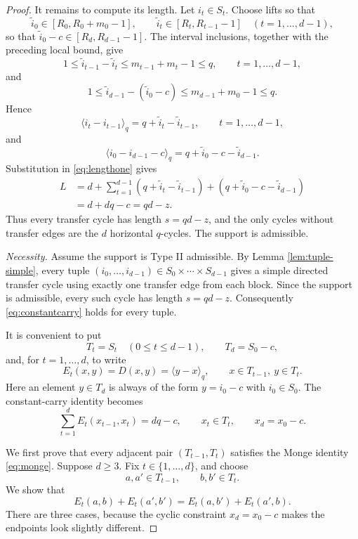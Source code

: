 \documentclass[10pt,a4paper]{amsart}
\begin{document}
\begin{proof}
It remains to compute its length.  Let $i_t\in S_t$.  Choose lifts so that
\[
        \widetilde i_0\in [R_0,R_0+m_0-1],
        \qquad
        \widetilde i_t\in [R_t,R_{t-1}-1]\quad(t=1,\ldots,d-1),
\]
so that $\widetilde i_0-c\in [R_d,R_{d-1}-1]$. The interval inclusions, together with the preceding local bound, give
\[
        1\le \widetilde i_{t-1}-\widetilde i_t
        \le m_{t-1}+m_t-1\le q,
        \qquad t=1,\ldots,d-1,
\]
and
\[
        1\le \widetilde i_{d-1}-(\widetilde i_0-c)
        \le m_{d-1}+m_0-1\le q.
\]
Hence
\[
        \langle i_t-i_{t-1}\rangle_q=q+\widetilde i_t-\widetilde i_{t-1},
        \qquad t=1,\ldots,d-1,
\]
and
\[
        \langle i_0-i_{d-1}-c\rangle_q=q+\widetilde i_0-c-\widetilde i_{d-1}.
\]
Substitution in \eqref{eq:lengthone} gives
\[
\begin{aligned}
        L
        &=d+\sum_{t=1}^{d-1}(q+\widetilde i_t-\widetilde i_{t-1})
          +(q+\widetilde i_0-c-\widetilde i_{d-1})  \\
        &=d+dq-c
        =qd-z .
\end{aligned}
\]
Thus every transfer cycle has length $s=qd-z$, and the only cycles without transfer edges are the $d$ horizontal $q$-cycles.  The support is admissible.

\medskip
\noindent\emph{Necessity.}
Assume the support is Type II admissible.  By Lemma \ref{lem:tuple-simple}, every tuple $(i_0,\ldots,i_{d-1})\in S_0\times\cdots\times S_{d-1}$ gives a simple directed transfer cycle using exactly one transfer edge from each block.  Since the support is admissible, every such cycle has length $s=qd-z$.  Consequently \eqref{eq:constantcarry} holds for every tuple.

It is convenient to put
\[
        T_t=S_t\quad(0\le t\le d-1),
        \qquad
        T_d=S_0-c,
\]
and, for $t=1,\ldots,d$, to write
\[
        E_t(x,y)=D(x,y)=\langle y-x\rangle_q,
        \qquad x\in T_{t-1},\ y\in T_t .
\]
Here an element $y\in T_d$ is always of the form $y=i_0-c$ with $i_0\in S_0$.  The constant-carry identity becomes
\begin{equation}
        \sum_{t=1}^d E_t(x_{t-1},x_t)=dq-c,
        \qquad x_t\in T_t,
        \qquad x_d=x_0-c .
        \label{eq:Tconstant}
\end{equation}

We first prove that every adjacent pair $(T_{t-1},T_t)$ satisfies the Monge identity \eqref{eq:monge}.  Suppose $d\ge3$.  Fix $t\in\{1,\ldots,d\}$, and choose
\[
        a,a'\in T_{t-1},
        \qquad
        b,b'\in T_t .
\]
We show that
\[
        E_t(a,b)+E_t(a',b')=E_t(a,b')+E_t(a',b).
\]
There are three cases, because the cyclic constraint $x_d=x_0-c$ makes the endpoints look slightly different.


\end{proof}
\end{document}
